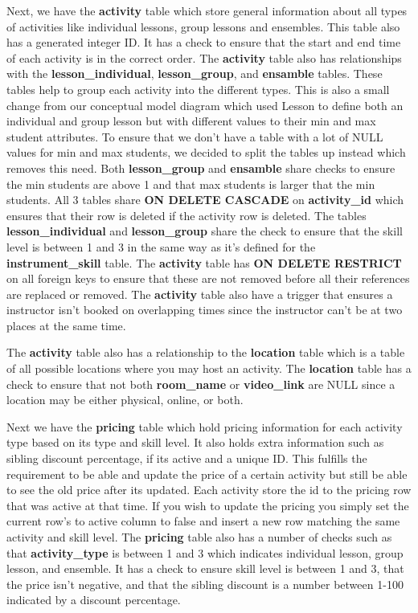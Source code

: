 \documentclass[a4paper]{scrartcl}
\begin{document}
Next, we have the \textbf{activity} table which store general information about all types of activities like individual lessons, group lessons and ensembles. This table also has a generated integer ID. It has a check to ensure that the start and end time of each activity is in the correct order. The \textbf{activity} table also has relationships with the \textbf{lesson\_individual}, \textbf{lesson\_group}, and \textbf{ensamble} tables. These tables help to group each activity into the different types. This is also a small change from our conceptual model diagram which used Lesson to define both an individual and group lesson but with different values to their min and max student attributes. To ensure that we don't have a table with a lot of NULL values for min and max students, we decided to split the tables up instead which removes this need. Both \textbf{lesson\_group} and \textbf{ensamble} share checks to ensure the min students are above 1 and that max students is larger that the min students. All 3 tables share \textbf{ON DELETE CASCADE} on \textbf{activity\_id} which ensures that their row is deleted if the activity row is deleted. The tables \textbf{lesson\_individual} and \textbf{lesson\_group} share the check to ensure that the skill level is between 1 and 3 in the same way as it's defined for the \textbf{instrument\_skill} table. The \textbf{activity} table has \textbf{ON DELETE RESTRICT} on all foreign keys to ensure that these are not removed before all their references are replaced or removed. The \textbf{activity} table also have a trigger that ensures a instructor isn't booked on overlapping times since the instructor can't be at two places at the same time.

The \textbf{activity} table also has a relationship to the \textbf{location} table which is a table of all possible locations where you may host an activity. The \textbf{location} table has a check to ensure that not both \textbf{room\_name} or \textbf{video\_link} are NULL since a location may be either physical, online, or both.

Next we have the \textbf{pricing} table which hold pricing information for each activity type based on its type and skill level. It also holds extra information such as sibling discount percentage, if its active and a unique ID. This fulfills the requirement to be able and update the price of a certain activity but still be able to see the old price after its updated. Each activity store the id to the pricing row that was active at that time. If you wish to update the pricing you simply set the current row's to active column to false and insert a new row matching the same activity and skill level. The \textbf{pricing} table also has a number of checks such as that \textbf{activity\_type} is between 1 and 3 which indicates individual lesson, group lesson, and ensemble. It has a check to ensure skill level is between 1 and 3, that the price isn't negative, and that the sibling discount is a number between 1-100 indicated by a discount percentage.
\end{document}
